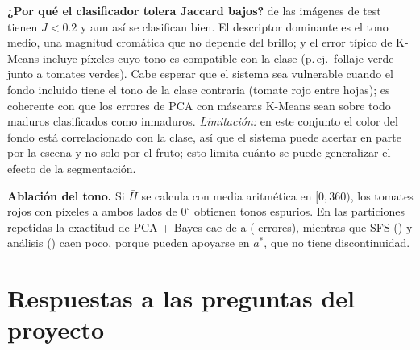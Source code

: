 \documentclass[11pt,a4paper]{article}
\begin{document}
\textbf{¿Por qué el clasificador tolera Jaccard bajos?} \TestLowJCorrect{} de las \NTest{}
imágenes de test tienen $J<0.2$ y aun así se clasifican bien. El descriptor dominante es el tono medio, una magnitud cromática
que no depende del brillo; y el error típico de K-Means incluye píxeles cuyo tono es
compatible con la clase (p.\,ej.\ follaje verde junto a tomates verdes). Cabe esperar que
el sistema sea vulnerable cuando el fondo incluido tiene el tono de la clase contraria
(tomate rojo entre hojas); es coherente con que los errores de PCA con máscaras K-Means sean
sobre todo maduros clasificados como inmaduros. \emph{Limitación:} en este conjunto el color
del fondo está correlacionado con la clase, así que el sistema puede acertar en parte por la
escena y no solo por el fruto; esto limita cuánto se puede generalizar el efecto de la
segmentación.

\textbf{Ablación del tono.} Si $\bar H$ se calcula con media aritmética en $[0,360)$, los
tomates rojos con píxeles a ambos lados de $0^\circ$ obtienen tonos espurios. En las
particiones repetidas la exactitud de PCA + Bayes cae de \PcaRepKmAcc{} a \PcaRepLinAcc{}
(\PcaRepLinErr{} errores), mientras que SFS (\SfsRepLinAcc) y análisis (\AnRepLinAcc) caen poco,
porque pueden apoyarse en $\bar a^*$, que no tiene discontinuidad.

\section{Respuestas a las preguntas del proyecto}
\end{document}
